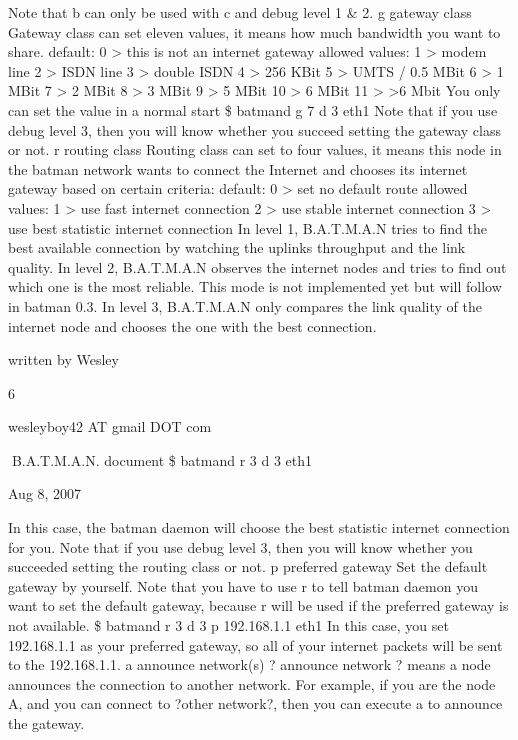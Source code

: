 \documentclass[
	12pt,
	a4paper,
	twoside,
	english,
	headsepline,
	footnosepline,
	automark,
	normalheadings,
	openany,
	cleardoubleplain,
	abstracton,
	idxtotoc,
	liststotoc,
	bibtotoc,
 	BCOR8mm,
]{scrartcl}
\begin{document}
Note that  b can only be used with  c and debug level 1 \& 2.   g gateway class Gateway class can set eleven values, it means how much bandwidth you want to share.           default:            0  > this is not an internet gateway           allowed values:  1  > modem line                               2  > ISDN line                             3  > double ISDN                                4  > 256 KBit                               5  > UMTS / 0.5 MBit                             6  > 1 MBit                             7  > 2 MBit                             8  > 3 MBit                             9  > 5 MBit                            10  > 6 MBit                            11  > >6 Mbit You only can set the value in a normal start \$ batmand  g 7  d 3  eth1 Note that if you use debug level 3, then you will know whether you succeed setting the  gateway class or not.  r routing class Routing class can set to four values, it means this node in the batman network wants to  connect the Internet and chooses its internet gateway based on certain criteria:           default:           0  > set no default route           allowed values:  1  > use fast internet connection                              2  > use stable internet connection                              3  > use best statistic internet connection In level 1, B.A.T.M.A.N tries to find the best available connection by watching the uplinks  throughput and the link quality. In level 2, B.A.T.M.A.N observes the internet nodes and tries to find out which one is the  most reliable. This mode is not implemented yet but will follow in batman 0.3. In level 3, B.A.T.M.A.N only compares the link quality of the internet node and chooses the  one with the best connection.

written by Wesley

6

wesleyboy42 AT gmail DOT com

B.A.T.M.A.N. document \$ batmand  r 3  d 3  eth1

Aug 8, 2007

In this case, the batman daemon will choose the best statistic internet connection for you. Note that if you use debug level 3, then you will know whether you succeeded setting the  routing class or not.  p preferred gateway Set the default gateway  by yourself. Note that you have to use  r to tell batman daemon you want to set the default gateway,  because  r will be used if the preferred gateway is not available. \$ batmand  r 3  d 3  p 192.168.1.1 eth1 In this case, you set 192.168.1.1 as your preferred gateway, so all of your internet packets will  be sent to the 192.168.1.1.  a announce network(s) ? announce network ? means a node announces the connection to another network. For example, if you are the node A, and you can connect to ?other network?, then you can  execute  a to announce the gateway.
\end{document}
